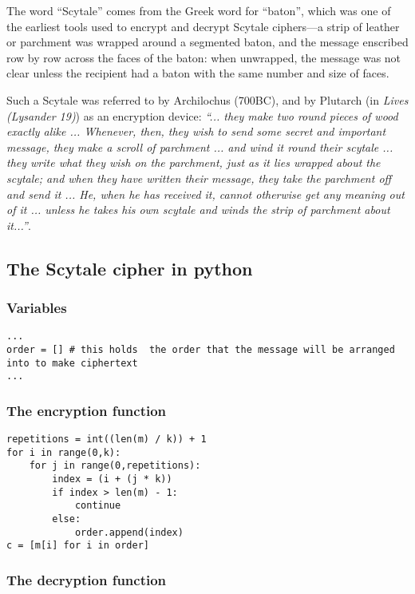 \documentclass{AIAA}
\begin{document}
The word ``Scytale'' comes from the Greek word for ``baton'', which was one of the earliest tools used to encrypt and decrypt Scytale ciphers---a strip of leather or parchment was wrapped around a segmented baton, and the message enscribed row by row across the faces of the baton: when unwrapped, the message was not clear unless the recipient had a baton with the same number and size of faces.

Such a Scytale was referred to by Archilochus (700BC), and by Plutarch (in \textit{Lives (Lysander 19)}) as an encryption device: \textit{``... they make two round pieces of wood exactly alike ... Whenever, then, they wish to send some secret and important message, they make a scroll of parchment ... and wind it round their scytale ... they write what they wish on the parchment, just as it lies wrapped about the scytale; and when they have written their message, they take the parchment off and send it ... He, when he has received it, cannot otherwise get any meaning out of it ... unless he takes his own scytale and winds the strip of parchment about it...''}.

\subsection{The Scytale cipher in python}

\subsubsection{Variables}

\begin{verbatim}
...
order = [] # this holds  the order that the message will be arranged into to make ciphertext
...
\end{verbatim}

\subsubsection{The encryption function}

\begin{verbatim}
repetitions = int((len(m) / k)) + 1
for i in range(0,k):
    for j in range(0,repetitions):
        index = (i + (j * k))
        if index > len(m) - 1:
            continue
        else:
            order.append(index)
c = [m[i] for i in order]
\end{verbatim}

\subsubsection{The decryption function}
\end{document}
